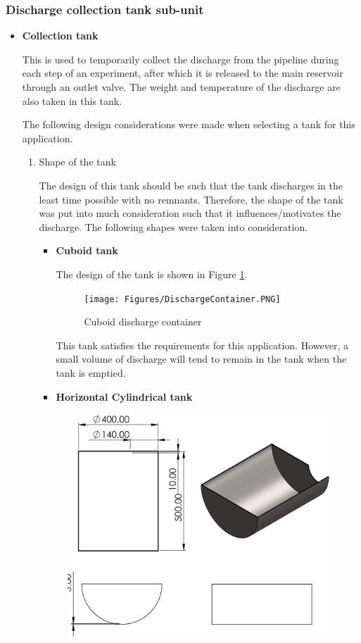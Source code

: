 \subsubsection{Discharge collection tank sub-unit}
\begin{itemize}
\item \textbf{Collection tank}
\par
This is used to temporarily collect the discharge from the pipeline during each step of an experiment, after which it is released to the main reservoir through an outlet valve. The weight and temperature of the discharge are also taken in this tank. 
\par
The following design considerations were made when selecting a tank for this application.
\begin{enumerate}
    \item Shape of the tank 
    \par
    The design of this tank should be such that the tank discharges in the least time possible with no remnants. Therefore, the shape of the tank was put into much consideration such that it influences/motivates the discharge. The following shapes were taken into consideration.
    \par
    \begin{itemize}
        \item \textbf{Cuboid tank}
        \par
    The design of the tank is shown in Figure \ref{fig:cuboid_discharge_container}.
    \begin{figure}[H]
        \centering
        \texttt{[image: Figures/DischargeContainer.PNG]}
        \caption{Cuboid discharge container}
        \label{fig:cuboid_discharge_container}
    \end{figure}
    This tank satisfies the requirements for this application. However, a small volume of discharge will tend to remain in the tank when the tank is emptied.
        \item  \textbf{Horizontal Cylindrical tank}
    \end{itemize}
    \begin{figure}[H]
        \centering
        \includegraphics[height=.25\textheight]{Figures/tank.PNG}

\end{figure}
\end{enumerate}
\end{itemize}
